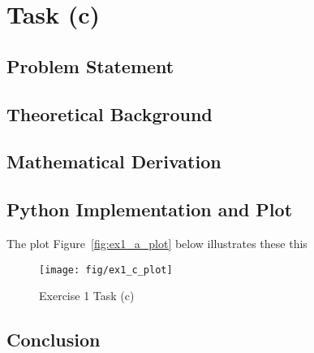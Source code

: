 \item[(c)]
\section*{Task (c)}

\subsection*{Problem Statement}

\subsection*{Theoretical Background}

\subsection*{Mathematical Derivation}

\subsection*{Python Implementation and Plot}
The plot Figure~\ref{fig:ex1_a_plot} below illustrates these this
\begin{figure}[h]
    \centering
    \texttt{[image: fig/ex1\_c\_plot]}
    \caption{Exercise 1 Task (c)}
    \label{fig:ex1_c_plot}
\end{figure}

\subsection*{Conclusion}